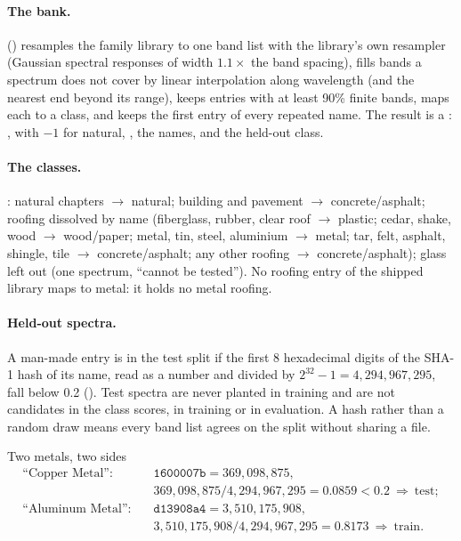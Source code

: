 \paragraph{The bank.}  () resamples the family library to one band list with the
library's own resampler (Gaussian spectral responses of width $1.1\times$ the band spacing), fills bands a spectrum does
not cover by linear interpolation along wavelength (and the nearest end beyond its range), keeps entries with at least
90\% finite bands, maps each to a class, and keeps the first entry of every repeated name. The result is a
:  ,   with $-1$ for natural, 
, the names, and the held-out class.

\paragraph{The classes.} : natural chapters $\to$ natural; building and pavement $\to$
concrete/asphalt; roofing dissolved by name (fiberglass, rubber, clear roof $\to$ plastic; cedar, shake, wood $\to$
wood/paper; metal, tin, steel, aluminium $\to$ metal; tar, felt, asphalt, shingle, tile $\to$ concrete/asphalt; any
other roofing $\to$ concrete/asphalt); glass left out (one spectrum, ``cannot be tested''). No roofing entry of the
shipped library maps to metal: it holds no metal roofing.

\paragraph{Held-out spectra.} A man-made entry is in the test split if the first 8 hexadecimal digits of the SHA-1 hash
of its name, read as a number and divided by $2^{32}-1=4{,}294{,}967{,}295$, fall below 0.2 (). Test
spectra are never planted in training and are not candidates in the class scores, in training or in evaluation. A hash
rather than a random draw means every band list agrees on the split without sharing a file.

\begin{worked}[label={we:namer:hash}]{Two metals, two sides}
\begin{align*}
\text{``Copper Metal''}: &\quad \texttt{1600007b} = 369{,}098{,}875,\\
&\quad 369{,}098{,}875/4{,}294{,}967{,}295 = 0.0859 < 0.2\ \Rightarrow\ \text{test};\\
\text{``Aluminum Metal''}: &\quad \texttt{d13908a4} = 3{,}510{,}175{,}908,\\
&\quad 3{,}510{,}175{,}908/4{,}294{,}967{,}295 = 0.8173\ \Rightarrow\ \text{train}.
\end{align*}
\end{worked}

